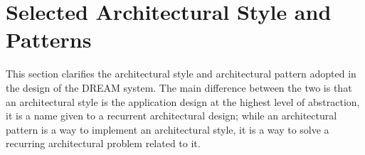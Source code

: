 \section{Selected Architectural Style and Patterns}
This section clarifies the architectural style and architectural pattern adopted in the design of the DREAM system.
The main difference between the two is that an architectural style is the application design at the highest level of abstraction, it is a name given to a recurrent architectural design; while an architectural pattern is a way to implement an architectural style, it is a way to solve a recurring architectural problem related to it.



